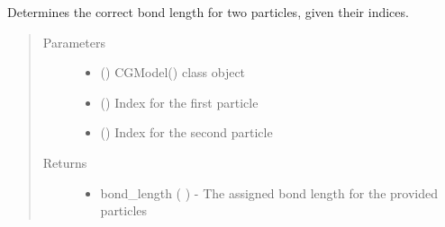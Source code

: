\documentclass[letterpaper,12pt,english,openany,oneside]{sphinxmanual}
\begin{document}
\begin{fulllineitems}
\begin{fulllineitems}
\label{\detokenize{cg_model:cg_model.cgmodel.CGModel.get_bond_length}}
Determines the correct bond length for two particles, given their indices.
\begin{quote}\begin{description}
\item[{Parameters}] \leavevmode\begin{itemize}
\item {} 
 () \textendash{} CGModel() class object

\item {} 
 () \textendash{} Index for the first particle

\item {} 
 () \textendash{} Index for the second particle

\end{itemize}

\item[{Returns}] \leavevmode
\begin{itemize}
\item {} 
bond\_length (  ) - The assigned bond length for the provided particles

\end{itemize}


\end{description}\end{quote}

\end{fulllineitems}



\end{fulllineitems}
\end{document}
